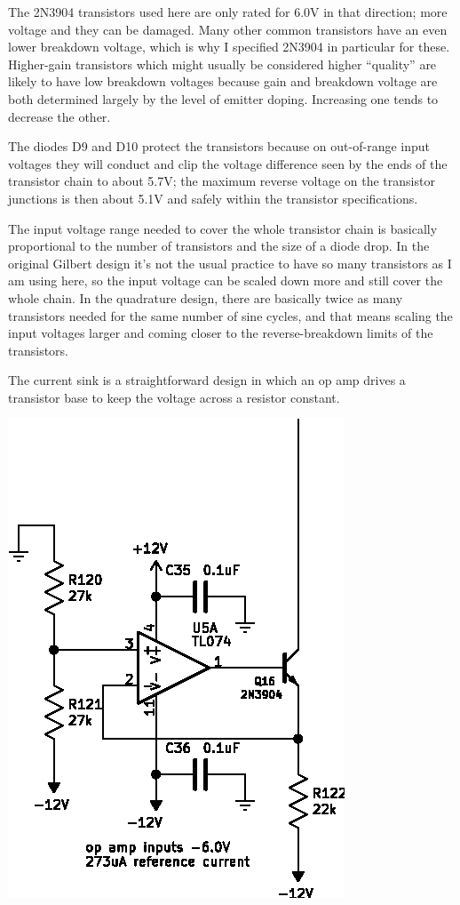 The 2N3904 transistors used here are only rated for 6.0V in that direction;
more voltage and they can be damaged.  Many other common transistors have an
even lower breakdown voltage, which is why I specified 2N3904 in particular
for these.  Higher-gain transistors which might usually be considered higher
``quality'' are likely to have low breakdown voltages because gain and
breakdown voltage are both determined largely by the level of emitter
doping.  Increasing one tends to decrease the other.

The diodes D9 and D10 protect the transistors because on out-of-range input
voltages they will conduct and clip the voltage difference seen by the ends
of the transistor chain to about 5.7V; the maximum reverse voltage on the
transistor junctions is then about 5.1V and safely within the transistor
specifications.

The input voltage range needed to cover the whole transistor chain is
basically proportional to the number of transistors and the size of a diode
drop.  In the original Gilbert design it's not the usual practice to have so
many transistors as I am using here, so the input voltage can be scaled down
more and still cover the whole chain.  In the quadrature design, there are
basically twice as many transistors needed for the same number of sine
cycles, and that means scaling the input voltages larger and coming closer
to the reverse-breakdown limits of the transistors.

The current sink is a straightforward design in which an op amp drives a
transistor base to keep the voltage across a resistor constant.

{\centering\includegraphics{sh-csink}\par}

